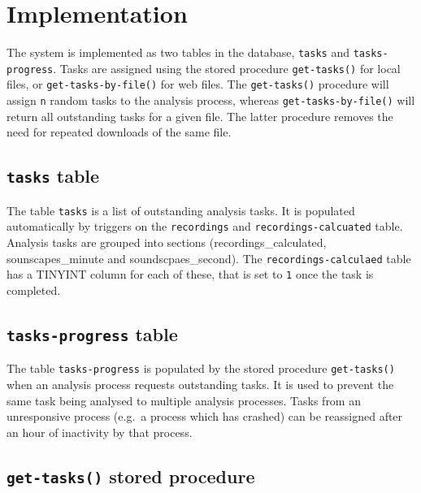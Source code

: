 \documentclass[
]{book}
\begin{document}
\hypertarget{implementation}{%
\section{Implementation}\label{implementation}}

The system is implemented as two tables in the database, \texttt{tasks} and \texttt{tasks-progress}. Tasks are assigned using the stored procedure \texttt{get-tasks()} for local files, or \texttt{get-tasks-by-file()} for web files. The \texttt{get-tasks()} procedure will assign \texttt{n} random tasks to the analysis process, whereas \texttt{get-tasks-by-file()} will return all outstanding tasks for a given file. The latter procedure removes the need for repeated downloads of the same file.

\hypertarget{tasks-table}{%
\subsection{\texorpdfstring{\texttt{tasks} table}{tasks table}}\label{tasks-table}}

The table \texttt{tasks} is a list of outstanding analysis tasks. It is populated automatically by triggers on the \texttt{recordings} and \texttt{recordings-calcuated} table. Analysis tasks are grouped into sections (recordings\_calculated, sounscapes\_minute and soundscpaes\_second). The \texttt{recordings-calculaed} table has a TINYINT column for each of these, that is set to \texttt{1} once the task is completed.

\hypertarget{tasks-progress-table}{%
\subsection{\texorpdfstring{\texttt{tasks-progress} table}{tasks-progress table}}\label{tasks-progress-table}}

The table \texttt{tasks-progress} is populated by the stored procedure \texttt{get-tasks()} when an analysis process requests outstanding tasks. It is used to prevent the same task being analysed to multiple analysis processes. Tasks from an unresponsive process (e.g.~a process which has crashed) can be reassigned after an hour of inactivity by that process.

\hypertarget{get-tasks-stored-procedure}{%
\subsection{\texorpdfstring{\texttt{get-tasks()} stored procedure}{get-tasks() stored procedure}}\label{get-tasks-stored-procedure}}
\end{document}
